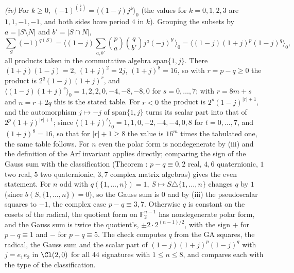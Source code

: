 \emph{(iv)} For $k \ge 0$, $(-1)^{\binom{k}{2}} = \langle (1 - j)j^{k}\rangle_{0}$ (the values for $k = 0, 1, 2, 3$ are $1, 1, -1, -1$, and both sides have period $4$ in $k$). Grouping the subsets by $a = |S \setminus N|$ and $b' = |S \cap N|$,
\[
\sum_{S}(-1)^{q(S)} = \Big\langle (1 - j)\sum_{a, b'}\binom{p}{a}\binom{q}{b'}j^{a}(-j)^{b'}\Big\rangle_{0} = \big\langle (1 - j)(1 + j)^{p}(1 - j)^{q}\big\rangle_{0},
\]
all products taken in the commutative algebra $\mathrm{span}\{1, j\}$. There $(1 + j)(1 - j) = 2$, $(1 + j)^{2} = 2j$, $(1 + j)^{8} = 16$, so with $r = p - q \ge 0$ the product is $2^{q}(1 - j)(1 + j)^{r}$, and $\langle (1 - j)(1 + j)^{s}\rangle_{0} = 1, 2, 2, 0, -4, -8, -8, 0$ for $s = 0, \dots, 7$; with $r = 8m + s$ and $n = r + 2q$ this is the stated table. For $r < 0$ the product is $2^{p}(1 - j)^{|r| + 1}$, and the automorphism $j \mapsto -j$ of $\mathrm{span}\{1, j\}$ turns its scalar part into that of $2^{p}(1 + j)^{|r| + 1}$; since $\langle (1 + j)^{t}\rangle_{0} = 1, 1, 0, -2, -4, -4, 0, 8$ for $t = 0, \dots, 7$, and $(1 + j)^{8} = 16$, so that for $|r| + 1 \ge 8$ the value is $16^{m}$ times the tabulated one, the same table follows. For $n$ even the polar form is nondegenerate by (iii) and the definition of the Arf invariant applies directly; comparing the sign of the Gauss sum with the classification (Theorem : $p - q \equiv 0, 2$ real, $4, 6$ quaternionic, $1$ two real, $5$ two quaternionic, $3, 7$ complex matrix algebras) gives the even statement. For $n$ odd with $q(\{1, \dots, n\}) = 1$, $S \mapsto S \triangle \{1, \dots, n\}$ changes $q$ by $1$ (since $b(S, \{1, \dots, n\}) = 0$), so the Gauss sum is $0$ and by (iii) the pseudoscalar squares to $-1$, the complex case $p - q \equiv 3, 7$. Otherwise $q$ is constant on the cosets of the radical, the quotient form on $\mathbb{F}_{2}^{n-1}$ has nondegenerate polar form, and the Gauss sum is twice the quotient's, $\pm 2 \cdot 2^{(n-1)/2}$, with the sign $+$ for $p - q \equiv 1$ and $-$ for $p - q \equiv 5$. The check computes $q$ from the GA squares, the radical, the Gauss sum and the scalar part of $(1 - j)(1 + j)^{p}(1 - j)^{q}$ with $j = e_{1}e_{2}$ in $\Cl(2,0)$ for all $44$ signatures with $1 \le n \le 8$, and compares each with the type of the classification.

